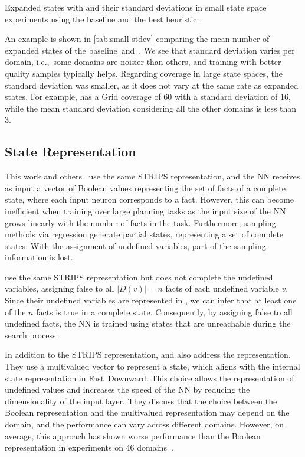 \begin{table}[tb]
    \caption[Expanded states with standard deviations in small state space experiments.]{Expanded states with \gbfs and their standard deviations in small state space experiments using the baseline \hnnbase and the best heuristic \hnnrs.}
    \label{tab:small-stdev}
    \addmargin
    \centering
    
\end{table}

An example is shown in \cref{tab:small-stdev} comparing the mean number of expanded states of the baseline~\hnnbase and~\hnnrs. We see that standard deviation varies per domain, i.e.,~some domains are noisier than others, and training with better-quality samples typically helps. Regarding coverage in large state spaces, the standard deviation was smaller, as it does not vary at the same rate as expanded states. For example, \hnnrs has a Grid coverage of $60$ with a standard deviation of $16$, while the mean standard deviation considering all the other domains is less than $3$.

\subsection{State Representation}
\label{sec:limitation-representation}

This work and others~\cite{ferber2020neural, ferber2022neural, otoole2022sampling} use the same STRIPS representation, and the NN receives as input a vector of Boolean values representing the set of facts of a complete state, where each input neuron corresponds to a fact. However, this can become inefficient when training over large planning tasks as the input size of the NN grows linearly with the number of facts in the task. Furthermore, sampling methods via regression generate partial states, representing a set of complete states. With the assignment of undefined variables, part of the sampling information is lost.

\citet{yu2020learning} use the same STRIPS representation but does not complete the undefined variables, assigning false to all $|D(v)|=n$ facts of each undefined variable $v$. Since their undefined variables are represented in \sas, we can infer that at least one of the $n$ facts is true in a complete state. Consequently, by assigning false to all undefined facts, the NN is trained using states that are unreachable during the search process.

In addition to the STRIPS representation, \citet{yu2020learning} and \citet{geissmann2015learning} also address the \sas representation. They use a multivalued vector to represent a state, which aligns with the internal state representation in Fast~Downward. This choice allows the representation of undefined values and increases the speed of the NN by reducing the dimensionality of the input layer. They discuss that the choice between the Boolean representation and the multivalued representation may depend on the domain, and the performance can vary across different domains. However, on average, this approach has shown worse performance than the Boolean representation in experiments on $46$ domains~\cite{yu2020learning}.
